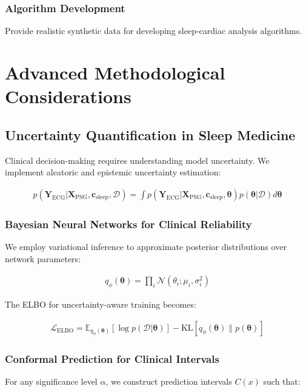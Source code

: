 \documentclass[11pt,en]{elegantpaper}
\begin{document}
\subsubsection{Algorithm Development}
Provide realistic synthetic data for developing sleep-cardiac analysis algorithms.

\section{Advanced Methodological Considerations}

\subsection{Uncertainty Quantification in Sleep Medicine}

Clinical decision-making requires understanding model uncertainty. We implement aleatoric and epistemic uncertainty estimation:

\begin{align}
p(\mathbf{Y}_{\text{ECG}} | \mathbf{X}_{\text{PSG}}, \mathbf{c}_{\text{sleep}}, \mathcal{D}) = \int p(\mathbf{Y}_{\text{ECG}} | \mathbf{X}_{\text{PSG}}, \mathbf{c}_{\text{sleep}}, \boldsymbol{\theta}) p(\boldsymbol{\theta} | \mathcal{D}) d\boldsymbol{\theta}
\end{align}

\subsubsection{Bayesian Neural Networks for Clinical Reliability}
We employ variational inference to approximate posterior distributions over network parameters:

\begin{align}
q_\phi(\boldsymbol{\theta}) = \prod_i \mathcal{N}(\theta_i; \mu_i, \sigma_i^2)
\end{align}

The ELBO for uncertainty-aware training becomes:

\begin{align}
\mathcal{L}_{\text{ELBO}} = \mathbb{E}_{q_\phi(\boldsymbol{\theta})}[\log p(\mathcal{D}|\boldsymbol{\theta})] - \text{KL}[q_\phi(\boldsymbol{\theta}) \| p(\boldsymbol{\theta})]
\end{align}

\subsubsection{Conformal Prediction for Clinical Intervals}
For any significance level $\alpha$, we construct prediction intervals $C(x)$ such that:
\end{document}
